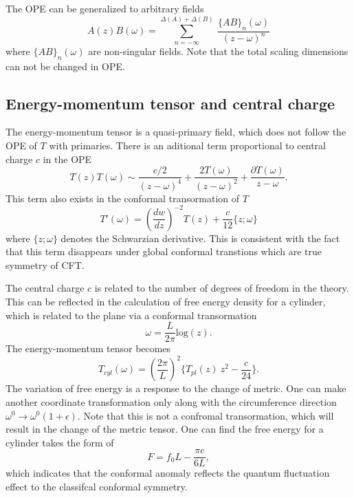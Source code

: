\documentclass[submission, PhysLectNotes]{SciPost}
\begin{document}
The OPE can be generalized to arbitrary fields
\begin{equation}
A(z) B(\omega) = \sum_{n=-\infty}^{\Delta(A) + \Delta(B)}\  \frac{\{AB\}_n(\omega)}{\left(z-\omega\right)^n}
\end{equation}
where $\{AB\}_n(\omega)$ are non-singular fields. Note that the total scaling dimensions can not be changed in OPE.



\subsection{Energy-momentum tensor and central charge}
The energy-momentum tensor is a quasi-primary field, which does not follow the OPE of $T$ with primaries. There is an aditional term proportional to central charge $c$ in the OPE
\begin{equation}
T(z)T(\omega) \sim \frac{c/2}{\left(z-\omega\right)^4} + \frac{2 T(\omega)}{\left(z-\omega\right)^2} + \frac{\partial T(\omega)}{z-\omega}.
\end{equation}
This term also exists in the conformal transormation of $T$
\begin{equation}
T'(\omega) = \left(\frac{dw}{dz}\right)^{-2} T(z) + \frac{c}{12}\{z;\omega\}
\end{equation}
where $\{z;\omega\}$ denotes the Schwarzian derivative. This is consistent with the fact that this term disappears under global conformal transtions which are true symmetry of CFT.

The central charge $c$ is related to the number of degrees of freedom in the theory. This can be reflected in the calculation of free energy density for a cylinder, which is related to the plane via a conformal transormation
\begin{equation}
\omega = \frac{L}{2\pi} \mathrm{log} (z).
\end{equation}
The energy-momentum tensor becomes
\begin{equation}
T_{cyl}(\omega) = \left(\frac{2\pi}{L}\right)^2 \{T_{pl}(z)\ z^2 - \frac{c}{24}\}.
\end{equation}
The variation of free energy is a response to the change of metric. One can make another coordinate transformation only along with the circumference direction $\omega^0 \rightarrow \omega^0(1+\epsilon)$. Note that this is not a confromal transormation, which will result in the change of the metric tensor. One can find the free energy for a cylinder takes the form of
\begin{equation}
F = f_0 L - \frac{\pi c}{6L},
\end{equation}
which indicates that the conformal anomaly reflects the quantum fluctuation effect to the classifcal conformal symmetry.
\end{document}
